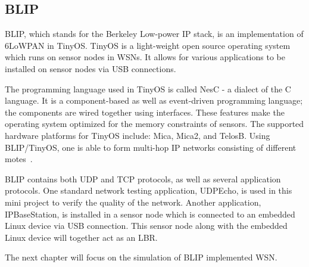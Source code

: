 \subsection{BLIP}
\label{Intr:BLIP}
BLIP, which stands for the Berkeley Low-power IP stack, is an implementation of 6LoWPAN in
TinyOS. TinyOS is a light-weight open source operating system which runs on sensor nodes in
WSNs. It allows for various applications to be installed on sensor nodes via USB connections.
\newline

The programming language used in TinyOS is called NesC - a dialect of the C language. It is
a component-based as well as event-driven programming language; the components are wired
together using interfaces. These features make the operating system optimized for the memory constraints of sensors. The supported hardware platforms for TinyOS include: Mica,
Mica2, and TelosB. Using BLIP/TinyOS, one is able to form multi-hop IP networks
consisting of different motes~\cite{BLIP}. 
\newline

BLIP contains both UDP and TCP protocols, as well as several application protocols. One standard network testing application, UDPEcho, is used in this mini project to verify the quality of the network. Another application, IPBaseStation, is installed in a sensor node which is connected to an embedded Linux device via USB connection.  This sensor node along with the embedded Linux device will together act as an LBR.
\newline

The next chapter will focus on the simulation of BLIP implemented WSN.





